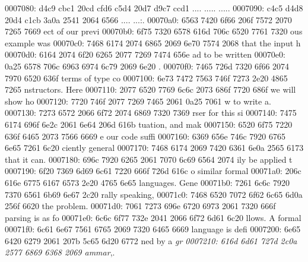 \begin{bo
00010e0: 7865 647d 5c62 6567 696e 7b76 6572 6261  xed}
\begin{verba
00010f0: 7469 6d7d 0a20 2023 7479 7065 2074 6572  tim}
\begin{
0001c40: 7665 7262 6174 696d 7d0a 2020 236c 6574  verbatim}
\begin{boxe
00027a0: 647d 5c62 6567 696e 7b76 6572 6261 7469  d}
\begin{verbati
00027b0: 6d7d 0a20 2023 6c65 7420 696e 6669 7865  m}
\begin{v
0002c60: 6572 6261 7469 6d7d 0a20 2023 6c65 7420  erbatim}
\begin{
0002dc0: 7665 7262 6174 696d 7d0a 2020 236c 6574  verbatim}
\begin{boxed
0002f30: 7d5c 6265 6769 6e7b 7665 7262 6174 696d  }
\begin{verbatim
0002f40: 7d0a 2020 236c 6574 2068 6428 683a 3a74  }
\begin{v
0003e60: 6572 6261 7469 6d7d 0a20 2023 236f 7065  erbatim}
\begin{boxed
00042b0: 7d5c 6265 6769 6e7b 7665 7262 6174 696d  }
\begin{verbatim
00042c0: 7d0a 2020 2328 782c 7429 3b3b 0a20 202d  }
\begin{boxed}
0007080: d4c9 cbc1 20cd cfd6 c5d4 20d7 d9c7 ccd1  .... ..... .....
0007090: c4c5 d4d8 20d4 c1cb 3a0a 2541 2064 6566  .... ...:.%
00070a0: 6563 7420 6f66 206f 7572 2070 7265 7669  ect of our previ
00070b0: 6f75 7320 6578 616d 706c 6520 7761 7320  ous example was 
00070c0: 7468 6174 2074 6865 2069 6e70 7574 2068  that the input h
00070d0: 6164 2074 6f20 6265 2077 7269 7474 656e  ad to be written
00070e0: 0a25 6578 706c 6963 6974 6c79 2069 6e20  .%
00070f0: 7465 726d 7320 6f66 2074 7970 6520 636f  terms of type co
0007100: 6e73 7472 7563 746f 7273 2e20 4865 7265  nstructors. Here
0007110: 2077 6520 7769 6c6c 2073 686f 7720 686f   we will show ho
0007120: 7720 746f 2077 7269 7465 2061 0a25 7061  w to write a.%
0007130: 7273 6572 2066 6f72 2074 6869 7320 7369  rser for this si
0007140: 7475 6174 696f 6e2c 2061 6e64 206d 616b  tuation, and mak
0007150: 6520 6f75 7220 636f 6465 2073 7566 6669  e our code suffi
0007160: 6369 656e 746c 7920 6765 6e65 7261 6c20  ciently general 
0007170: 7468 6174 2069 7420 6361 6e0a 2565 6173  that it can.%
0007180: 696c 7920 6265 2061 7070 6c69 6564 2074  ily be applied t
0007190: 6f20 7369 6d69 6c61 7220 666f 726d 616c  o similar formal
00071a0: 206c 616e 6775 6167 6573 2e20 4765 6e65   languages. Gene
00071b0: 7261 6c6c 7920 7370 6561 6b69 6e67 2c20  rally speaking, 
00071c0: 7468 6520 7072 6f62 6c65 6d0a 256f 6620  the problem.%
00071d0: 7061 7273 696e 6720 6973 2061 7320 666f  parsing is as fo
00071e0: 6c6c 6f77 732e 2041 2066 6f72 6d61 6c20  llows. A formal 
00071f0: 6c61 6e67 7561 6765 2069 7320 6465 6669  language is defi
0007200: 6e65 6420 6279 2061 207b 5c65 6d20 6772  ned by a {\em gr
0007210: 616d 6d61 727d 2c0a 2577 6869 6368 2069  ammar},.%

\end{boxed}
\end{verbatim
00042c0: 7d0a 2020 2328 782c 7429 3b3b 0a20 202d  }
\end{boxed
00042b0: 7d5c 6265 6769 6e7b 7665 7262 6174 696d  }
\end{v
0003e60: 6572 6261 7469 6d7d 0a20 2023 236f 7065  erbatim}
\end{verbatim
0002f40: 7d0a 2020 236c 6574 2068 6428 683a 3a74  }
\end{boxed
0002f30: 7d5c 6265 6769 6e7b 7665 7262 6174 696d  }
\end{
0002dc0: 7665 7262 6174 696d 7d0a 2020 236c 6574  verbatim}
\end{v
0002c60: 6572 6261 7469 6d7d 0a20 2023 6c65 7420  erbatim}
\end{verbati
00027b0: 6d7d 0a20 2023 6c65 7420 696e 6669 7865  m}
\end{boxe
00027a0: 647d 5c62 6567 696e 7b76 6572 6261 7469  d}
\end{
0001c40: 7665 7262 6174 696d 7d0a 2020 236c 6574  verbatim}
\end{verba
00010f0: 7469 6d7d 0a20 2023 7479 7065 2074 6572  tim}
\end{bo
00010e0: 7865 647d 5c62 6567 696e 7b76 6572 6261  xed}
